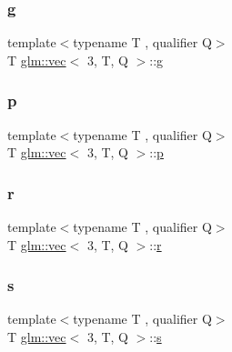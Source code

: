 \subsubsection{\texorpdfstring{g}{g}}
{\footnotesize\ttfamily template$<$typename T , qualifier Q$>$ \\
T \mbox{\hyperlink{structglm_1_1vec}{glm\+::vec}}$<$ 3, T, Q $>$\+::\mbox{\hyperlink{_s_d_l__opengl__glext_8h_acaceb3a655ff28b75259860bcb868f9f}{g}}}

\mbox{\label{structglm_1_1vec_3_013_00_01_t_00_01_q_01_4_acc882ded9421aad1b65564cde0ca1411}} 
\subsubsection{\texorpdfstring{p}{p}}
{\footnotesize\ttfamily template$<$typename T , qualifier Q$>$ \\
T \mbox{\hyperlink{structglm_1_1vec}{glm\+::vec}}$<$ 3, T, Q $>$\+::\mbox{\hyperlink{_s_d_l__opengl__glext_8h_aa5367c14d90f462230c2611b81b41d23}{p}}}

\mbox{\label{structglm_1_1vec_3_013_00_01_t_00_01_q_01_4_a7c3057b389465e2d02536d22ae2c1110}} 
\subsubsection{\texorpdfstring{r}{r}}
{\footnotesize\ttfamily template$<$typename T , qualifier Q$>$ \\
T \mbox{\hyperlink{structglm_1_1vec}{glm\+::vec}}$<$ 3, T, Q $>$\+::\mbox{\hyperlink{_s_d_l__opengl_8h_a42ce7cdc612e53abee15043f80220d97}{r}}}

\mbox{\label{structglm_1_1vec_3_013_00_01_t_00_01_q_01_4_ab09b6a68cfa21e42185cd4aff2a7c55e}} 
\subsubsection{\texorpdfstring{s}{s}}
{\footnotesize\ttfamily template$<$typename T , qualifier Q$>$ \\
T \mbox{\hyperlink{structglm_1_1vec}{glm\+::vec}}$<$ 3, T, Q $>$\+::\mbox{\hyperlink{_s_d_l__opengl_8h_a4af680a6c683f88ed67b76f207f2e6e4}{s}}}

